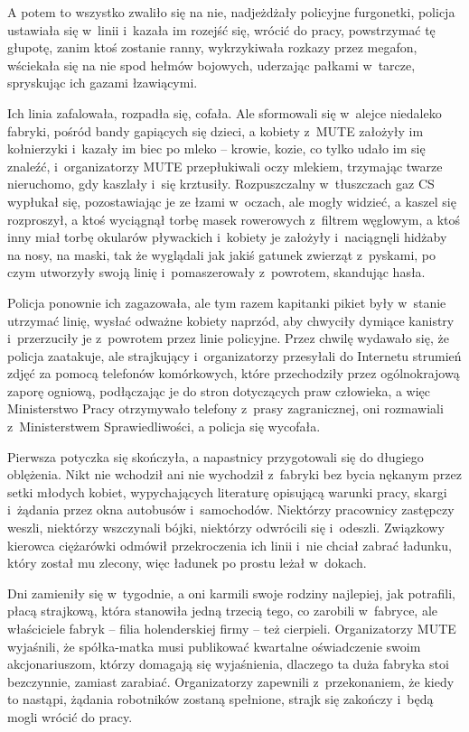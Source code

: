 \documentclass[oneside,polish,11pt,rmheadings]{mwbk}
\begin{document}
A potem to wszystko zwaliło się na nie, nadjeżdżały policyjne furgonetki, policja ustawiała się w~linii i~kazała im rozejść się, wrócić do pracy, powstrzymać tę głupotę, zanim ktoś zostanie ranny, wykrzykiwała rozkazy przez megafon, wściekała się na nie spod hełmów bojowych, uderzając pałkami w~tarcze, spryskując ich gazami łzawiącymi. 


Ich linia zafalowała, rozpadła się, cofała. Ale sformowali się w~alejce niedaleko fabryki, pośród bandy gapiących się dzieci, a kobiety z~MUTE założyły im kołnierzyki i~kazały im biec po mleko -- krowie, kozie, co tylko udało im się znaleźć, i~organizatorzy MUTE przepłukiwali oczy mlekiem, trzymając twarze nieruchomo, gdy kaszlały i~się krztusiły. Rozpuszczalny w~tłuszczach gaz CS wypłukał się, pozostawiając je ze łzami w~oczach, ale mogły widzieć, a kaszel się rozproszył, a ktoś wyciągnął torbę masek rowerowych z~filtrem węglowym, a ktoś inny miał torbę okularów pływackich i~kobiety je założyły i~naciągnęli hidżaby na nosy, na maski, tak że wyglądali jak jakiś gatunek zwierząt z~pyskami, po czym utworzyły swoją linię i~pomaszerowały z~powrotem, skandując hasła. 


Policja ponownie ich zagazowała, ale tym razem kapitanki pikiet były w~stanie utrzymać linię, wysłać odważne kobiety naprzód, aby chwyciły dymiące kanistry i~przerzuciły je z~powrotem przez linie policyjne. Przez chwilę wydawało się, że policja zaatakuje, ale strajkujący i~organizatorzy przesyłali do Internetu strumień zdjęć za pomocą telefonów komórkowych, które przechodziły przez ogólnokrajową zaporę ogniową, podłączając je do stron dotyczących praw człowieka, a więc Ministerstwo Pracy otrzymywało telefony z~prasy zagranicznej, oni rozmawiali z~Ministerstwem Sprawiedliwości, a policja się wycofała. 


Pierwsza potyczka się skończyła, a napastnicy przygotowali się do długiego oblężenia. Nikt nie wchodził ani nie wychodził z~fabryki bez bycia nękanym przez setki młodych kobiet, wypychających literaturę opisującą warunki pracy, skargi i~żądania przez okna autobusów i~samochodów. Niektórzy pracownicy zastępczy weszli, niektórzy wszczynali bójki, niektórzy odwrócili się i~odeszli. Związkowy kierowca ciężarówki odmówił przekroczenia ich linii i~nie chciał zabrać ładunku, który został mu zlecony, więc ładunek po prostu leżał w~dokach. 


Dni zamieniły się w~tygodnie, a oni karmili swoje rodziny najlepiej, jak potrafili, płacą strajkową, która stanowiła jedną trzecią tego, co zarobili w~fabryce, ale właściciele fabryk -- filia holenderskiej firmy -- też cierpieli. Organizatorzy MUTE wyjaśnili, że spółka-matka musi publikować kwartalne oświadczenie swoim akcjonariuszom, którzy domagają się wyjaśnienia, dlaczego ta duża fabryka stoi bezczynnie, zamiast zarabiać. Organizatorzy zapewnili z~przekonaniem, że kiedy to nastąpi, żądania robotników zostaną spełnione, strajk się zakończy i~będą mogli wrócić do pracy. 
\end{document}
